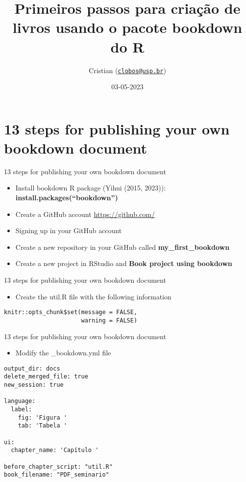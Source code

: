 \documentclass[
  ignorenonframetext,
]{beamer}
\title{Primeiros passos para criação de livros usando o pacote bookdown
do R}
\author{Cristian
(\href{mailto:clobos@usp.br}{\nolinkurl{clobos@usp.br}})}
\date{03-05-2023}
\institute{USP, Departamento de Ciências Exatas}
\providecommand{\tightlist}{%
  \setlength{\itemsep}{0pt}\setlength{\parskip}{0pt}}
\begin{document}
\frame{\titlepage}

\hypertarget{steps-for-publishing-your-own-bookdown-document}{%
\section{13 steps for publishing your own bookdown
document}\label{steps-for-publishing-your-own-bookdown-document}}

\begin{frame}{13 steps for publishing your own bookdown document}
\protect\hypertarget{steps-for-publishing-your-own-bookdown-document-1}{}
\begin{itemize}
\tightlist
\item
  Install bookdown R package (Yihui (2015, 2023)):
  \textbf{install.packages(``bookdown'')}
\item
  Create a GitHub account \url{https://github.com/}
\item
  Signing up in your GitHub account
\item
  Create a new repository in your GitHub called
  \textbf{my\_first\_bookdown}
\item
  Create a new project in RStudio and \textbf{Book project using
  bookdown}
\end{itemize}
\end{frame}

\begin{frame}[fragile]{13 steps for publishing your own bookdown
document}
\protect\hypertarget{steps-for-publishing-your-own-bookdown-document-2}{}
\begin{itemize}
\tightlist
\item
  Create the util.R file with the following information
\end{itemize}

\begin{verbatim}
knitr::opts_chunk$set(message = FALSE, 
                      warning = FALSE)
\end{verbatim}
\end{frame}

\begin{frame}[fragile]{13 steps for publishing your own bookdown
document}
\protect\hypertarget{steps-for-publishing-your-own-bookdown-document-3}{}
\begin{itemize}
\tightlist
\item
  Modify the \_bookdown.yml file
\end{itemize}

\begin{verbatim}
output_dir: docs
delete_merged_file: true
new_session: true

language:
  label:
    fig: 'Figura '
    tab: 'Tabela '

ui:
  chapter_name: 'Capítulo '
  
before_chapter_script: "util.R"
book_filename: "PDF_seminario" 
\end{verbatim}
\end{frame}
\end{document}
